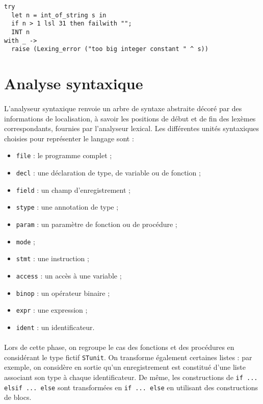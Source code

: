 \documentclass[a4paper,12pt]{article}
\begin{document}
\begin{lstlisting}
try
  let n = int_of_string s in
  if n > 1 lsl 31 then failwith "";
  INT n
with _ -> 
  raise (Lexing_error ("too big integer constant " ^ s))
\end{lstlisting}

\section{Analyse syntaxique}

\paragraph*{}
L'analyseur syntaxique renvoie un arbre de syntaxe abstraite décoré par des informations de localisation, à savoir les positions de début et de fin des lexèmes correspondants, fournies par l'analyseur lexical. Les différentes unités syntaxiques choisies pour représenter le langage sont :

\begin{itemize}
\item \texttt{file} : le programme complet ;
\item \texttt{decl} : une déclaration de type, de variable ou de fonction ;
\item \texttt{field} : un champ d'enregistrement ;
\item \texttt{stype} : une annotation de type ;
\item \texttt{param} : un paramètre de fonction ou de procédure ;
\item \texttt{mode} ;
\item \texttt{stmt} : une instruction ;
\item \texttt{access} : un accès à une variable ;
\item \texttt{binop} : un opérateur binaire ;
\item \texttt{expr} : une expression ;
\item \texttt{ident} : un identificateur.
\end{itemize}

\paragraph*{}
Lors de cette phase, on regroupe le cas des fonctions et des procédures en considérant le type fictif \texttt{STunit}. On transforme également certaines listes : par exemple, on considère en sortie qu'un enregistrement est constitué d'une liste associant son type à chaque identificateur. De même, les constructions de \texttt{if ... elsif ... else} sont transformées en \texttt{if ... else} en utilisant des constructions de blocs.
\end{document}
